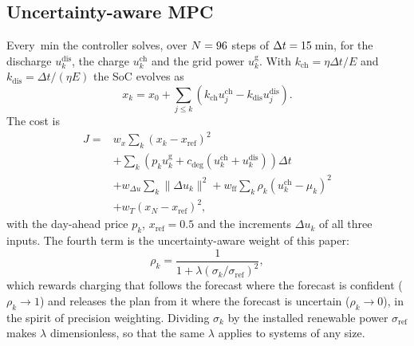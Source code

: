 \documentclass[a4paper,fleqn]{cas-dc}
\begin{document}
\subsection{Uncertainty-aware MPC}\label{sec:mpc}
Every \replanmin\,min the controller solves, over $N=96$ steps of $\Delta t=15$\,min, for the discharge $u^{\mathrm{dis}}_k$, the charge $u^{\mathrm{ch}}_k$ and the grid power $u^{\mathrm{g}}_k$. With $k_{\mathrm{ch}}=\eta\Delta t/E$ and $k_{\mathrm{dis}}=\Delta t/(\eta E)$ the SoC evolves as
\begin{equation}
x_{k}=x_0+\sum_{j\le k}\left(k_{\mathrm{ch}}u^{\mathrm{ch}}_j-k_{\mathrm{dis}}u^{\mathrm{dis}}_j\right).\label{eq:soc}
\end{equation}
The cost is
\begin{align}
J={}&w_x\sum_{k}(x_k-x_{\mathrm{ref}})^2\nonumber\\
&+\sum_k\left(p_k u^{\mathrm{g}}_k+c_{\mathrm{deg}}(u^{\mathrm{ch}}_k+u^{\mathrm{dis}}_k)\right)\Delta t\nonumber\\
&+w_{\Delta u}\sum_k\|\Delta u_k\|^2+w_{\mathrm{ff}}\sum_k\rho_k\left(u^{\mathrm{ch}}_k-\mu_k\right)^2\nonumber\\
&+w_T(x_N-x_{\mathrm{ref}})^2,\label{eq:cost}
\end{align}
with the day-ahead price $p_k$, $x_{\mathrm{ref}}=0.5$ and the increments $\Delta u_k$ of all three inputs. The fourth term is the uncertainty-aware weight of this paper:
\begin{equation}
\rho_k=\frac{1}{1+\lambda\left(\sigma_k/\sigma_{\mathrm{ref}}\right)^2},\label{eq:rho}
\end{equation}
which rewards charging that follows the forecast where the forecast is confident ($\rho_k\to1$) and releases the plan from it where the forecast is uncertain ($\rho_k\to0$), in the spirit of precision weighting. Dividing $\sigma_k$ by the installed renewable power $\sigma_{\mathrm{ref}}$ makes $\lambda$ dimensionless, so that the same $\lambda$ applies to systems of any size.
\end{document}
